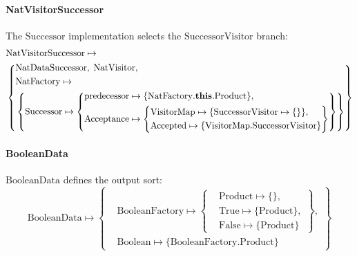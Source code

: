 \paragraph{NatVisitorSuccessor}
The $\mathrm{Successor}$ implementation selects the $\mathrm{SuccessorVisitor}$ branch:
\[
  \begin{aligned}
    &\mathrm{NatVisitorSuccessor} \mapsto \\
    &\left\{
    \begin{aligned}
      &\mathrm{NatDataSuccessor},\; \mathrm{NatVisitor},\\
      &\mathrm{NatFactory} \mapsto \\
      &\left\{\mathrm{Successor} \mapsto \left\{
            \begin{aligned}
              &\mathrm{predecessor} \mapsto \{\mathrm{NatFactory}.\mathbf{this}.\mathrm{Product}\},\\
              &\mathrm{Acceptance} \mapsto \left\{
                \begin{aligned}
                  &\mathrm{VisitorMap} \mapsto \{\mathrm{SuccessorVisitor} \mapsto \{\}\},\\
                  &\mathrm{Accepted} \mapsto \{\mathrm{VisitorMap}.\mathrm{SuccessorVisitor}\}
              \end{aligned}\right\}
          \end{aligned}\right\}\right\}
  \end{aligned}\right\}
  \end{aligned}
\]

\paragraph{BooleanData}
$\mathrm{BooleanData}$ defines the output sort:
\[
  \mathrm{BooleanData} \mapsto \left\{
    \begin{aligned}
      &\mathrm{BooleanFactory} \mapsto \left\{
        \begin{aligned}
          &\mathrm{Product} \mapsto \{\},\\
          &\mathrm{True} \mapsto \{\mathrm{Product}\},\\
          &\mathrm{False} \mapsto \{\mathrm{Product}\}
      \end{aligned}\right\},\\
      &\mathrm{Boolean} \mapsto \{\mathrm{BooleanFactory}.\mathrm{Product}\}
  \end{aligned}\right\}
\]
